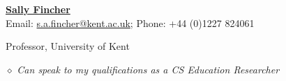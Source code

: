 \documentclass[10pt]{article}
\newenvironment{innerlist}[1][\enskip\textbullet]%
        {\begin{compactitem}[#1]}{\end{compactitem}}
\newcommand{\blankline}{\quad\pagebreak[2]}
\providecommand*\email[1]{\href{mailto:#1}{#1}}
\begin{document}
\blankline

\href{http://www.cs.kent.ac.uk/people/staff/saf/}{\textbf{Sally Fincher}}
\\ Email: \email{s.a.fincher@kent.ac.uk}; Phone: +44 (0)1227 824061
\begin{innerlist}
    \item Professor, University of Kent
    \item[$\diamond$] \emph{Can speak to my qualifications as a CS Education Researcher}
\end{innerlist}





\end{document}
